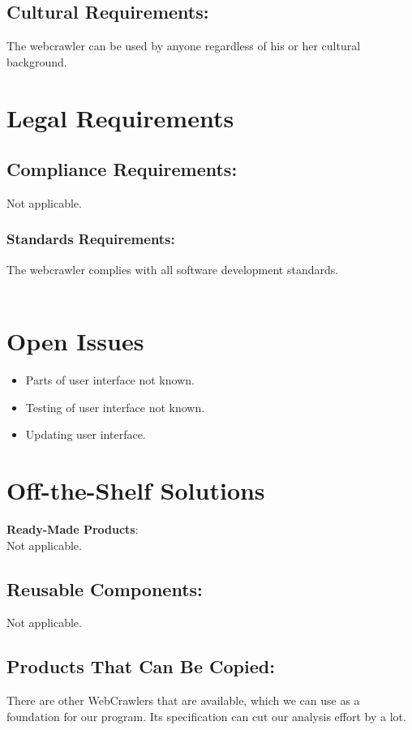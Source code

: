 \documentclass[titlepage]{article}
\begin{document}
\subsection*{Cultural Requirements:}

The webcrawler can be used by anyone regardless of his or her cultural background.

\section{Legal Requirements }

\subsection*{Compliance Requirements:}

Not applicable.

\subsubsection*{Standards Requirements:}

The webcrawler complies with all software development standards.\\
\\

\section{Open Issues }

\begin{itemize}
  \item Parts of user interface not known.
  \item Testing of user interface not known.
  \item Updating user interface.
\end{itemize}


\section{Off-the-Shelf Solutions }
\textbf{Ready-Made Products}:\\ Not applicable.

\subsection*{Reusable Components:}
Not applicable.

\subsection*{Products That Can Be Copied:}
There are other WebCrawlers that are available, which we can use as a foundation for our program. Its specification can cut our analysis effort by a lot.
\end{document}
